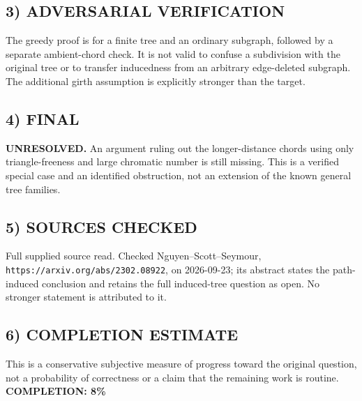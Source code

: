 \subsection{3) ADVERSARIAL VERIFICATION}
The greedy proof is for a finite tree and an ordinary subgraph, followed by a separate ambient-chord check. It is not valid to confuse a subdivision with the original tree or to transfer inducedness from an arbitrary edge-deleted subgraph. The additional girth assumption is explicitly stronger than the target.
\subsection{4) FINAL}
\textbf{UNRESOLVED.}
An argument ruling out the longer-distance chords using only triangle-freeness and large chromatic number is still missing. This is a verified special case and an identified obstruction, not an extension of the known general tree families.
\subsection{5) SOURCES CHECKED}
Full supplied source read. Checked Nguyen--Scott--Seymour, \texttt{https://arxiv.org/abs/2302.08922}, on 2026-09-23; its abstract states the path-induced conclusion and retains the full induced-tree question as open. No stronger statement is attributed to it.
\subsection{6) COMPLETION ESTIMATE}
This is a conservative subjective measure of progress toward the original question, not a probability of correctness or a claim that the remaining work is routine.
\textbf{COMPLETION: 8\%}
